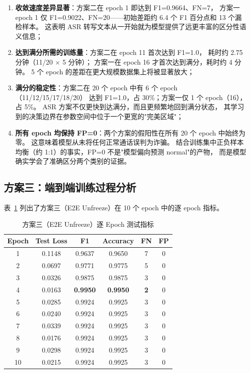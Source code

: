 \documentclass[11pt,a4paper]{ctexart}
\begin{document}
\begin{enumerate}[label=(\arabic*)]
  \item \textbf{收敛速度差异显著}：方案二在 epoch 1 即达到 F1=0.9664、FN=7，
  方案一 epoch 1 仅 F1=0.9022、FN=20——初始差距约 6.4 个 F1 百分点和 13 个漏检样本。
  这表明 ASR 转写文本从一开始就为模型提供了远更丰富的区分性语义信息；

  \item \textbf{达到满分所需的训练量}：方案二在 epoch 11 首次达到 F1=1.0，
  耗时约 2.75 分钟（11/20 $\times$ 5 分钟）；
  方案一在 epoch 16 才首次达到满分，耗时约 4 分钟。
  5 个 epoch 的差距在更大规模数据集上将被显著放大；

  \item \textbf{满分的稳定性}：方案二在 20 个 epoch 中有 6 个 epoch（11/12/15/17/18/20）
  达到 F1=1.0，占 30\%；方案一仅 1 个 epoch（16），占 5\%。
  ASR 方案不仅更快到达满分，而且更频繁地回到满分状态，
  其学习到的决策边界在参数空间中位于一个更宽的"完美区域"；

  \item \textbf{所有 epoch 均保持 FP=0}：两个方案的假阳性在所有 20 个 epoch 中始终为零。
  这意味着模型从未将任何正常通话误判为诈骗。
  结合训练集中正负样本均衡（约 1:1）的事实，FP=0 不是"模型偏向预测 normal"的产物，
  而是模型确实学会了准确区分两个类别的证据。
\end{enumerate}

\subsection{方案三：端到端训练过程分析}

表~\ref{tab:e2e_epochs} 列出了方案三（E2E Unfreeze）在 10 个 epoch 中的逐 epoch 指标。

\begin{table}[H]\centering
\caption{方案三（E2E Unfreeze）逐 Epoch 测试指标}
\label{tab:e2e_epochs}
\begin{tabular}{@{}cccccc@{}}\toprule
\textbf{Epoch} & \textbf{Test Loss} & \textbf{F1} & \textbf{Accuracy} & \textbf{FN} & \textbf{FP}\\\midrule
1  & 0.1148 & 0.9637 & 0.9650 & 7  & 0\\
2  & 0.0697 & 0.9771 & 0.9775 & 5  & 0\\
3  & 0.0326 & 0.9875 & 0.9875 & 3  & 0\\
4  & 0.0163 & \textbf{0.9950} & \textbf{0.9950} & \textbf{2} & 0\\
5  & 0.0285 & 0.9924 & 0.9925 & 3  & 0\\
6  & 0.0240 & 0.9924 & 0.9925 & 3  & 0\\
7  & 0.0339 & 0.9924 & 0.9925 & 3  & 0\\
8  & 0.0176 & 0.9924 & 0.9925 & 3  & 0\\
9  & 0.0298 & 0.9924 & 0.9925 & 3  & 0\\
10 & 0.0215 & 0.9924 & 0.9925 & 3  & 0\\\bottomrule
\end{tabular}
\end{table}
\end{document}
